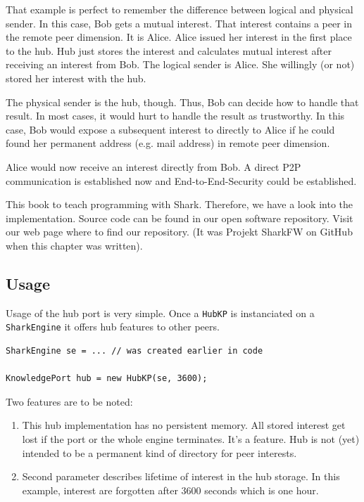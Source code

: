 {That example is perfect to remember the difference between logical and physical sender. In this case, Bob gets a mutual interest. That interest contains a peer in the remote peer dimension. It is Alice. Alice issued her interest in the first place to the hub. Hub just stores the interest and calculates mutual interest after receiving an interest from Bob. The logical sender is Alice. She willingly (or not) stored her interest with the hub.

The physical sender is the hub, though. Thus, Bob can decide how to handle that result. In most cases, it would hurt to handle the result as trustworthy. In this case, Bob would expose a subsequent interest to directly to Alice if he could found her permanent address (e.g. mail address) in remote peer dimension. 

Alice would now receive an interest directly from Bob. A direct P2P communication is established now and End-to-End-Security could be established.

This book to teach programming with Shark. Therefore, we have a look into the implementation. Source code can be found in our open software repository. Visit our web page where to find our repository. (It was Projekt SharkFW on GitHub when this chapter was written).

\subsection{Usage}
Usage of the hub port is very simple. Once a {\tt HubKP} is instanciated on a {\tt SharkEngine} it offers hub features to other peers.

\begin{verbatim}
SharkEngine se = ... // was created earlier in code

KnowledgePort hub = new HubKP(se, 3600);
\end{verbatim}

Two features are to be noted:

\begin{enumerate}
\item 
This hub implementation has no persistent memory. All stored interest get lost if the port or the whole engine terminates. It's a feature. Hub is not (yet) intended to be a permanent kind of directory for peer interests.
\item 
Second parameter describes lifetime of interest in the hub storage. In this example, interest are forgotten after 3600 seconds which is one hour.
\end{enumerate}

}
